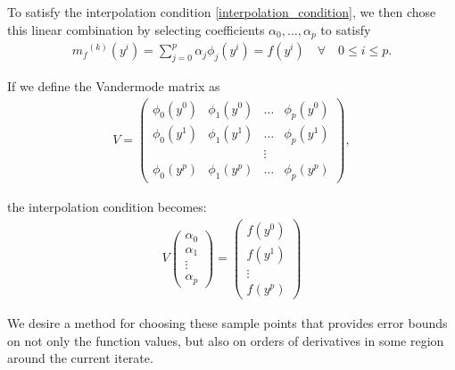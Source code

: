\documentclass{article}
\theoremstyle{case}
\newcommand{\mfk}{{{m}_f}^{(k)}}
\begin{document}
To satisfy the interpolation condition \cref{interpolation_condition}, we then chose this linear combination by selecting coefficients $\alpha_0, \ldots, \alpha_p$ to satisfy
\begin{align}
\label{interpolation_formula}
    \mfk(y^i) = \sum^p_{j=0}\alpha_j\phi_j(y^i) = f(y^i) \quad \forall \quad 0 \le i \le p.
\end{align}

If we define the Vandermode matrix as
\begin{align}
\label{vandermonde}
V=
\begin{pmatrix}
    \phi_0(y^0)      & \phi_1(y^0)       & \ldots & \phi_{p}(y^0)      \\
    \phi_0(y^1)      & \phi_1(y^1)       & \dots  & \phi_{p}(y^1)      \\
                     &                   & \vdots &                    \\
    \phi_0(y^{p})    & \phi_1(y^{p})     & \ldots & \phi_{p}(y^{p})
\end{pmatrix},
\end{align}

the interpolation condition becomes:
\begin{align}
\label{matrix_form}
V
\begin{pmatrix}
    \alpha_0     \\
    \alpha_1     \\
    \vdots       \\
    \alpha_p
\end{pmatrix}
=
\begin{pmatrix}
    f(y^0)     \\
    f(y^1)     \\
    \vdots     \\
    f(y^p)
\end{pmatrix}
\end{align}

We desire a method for choosing these sample points that provides error bounds on not only the function values, but also on orders of derivatives in some region around the current iterate.

\end{document}
